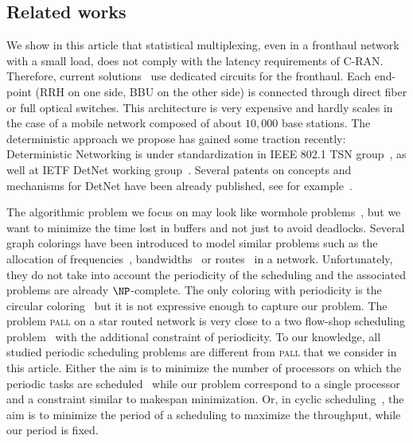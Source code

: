 \documentclass[a4paper,10pt]{article}
\newcommand\pall{\textsc{pall}\xspace}
\begin{document}
 \subsection*{Related works}

  We show in this article that statistical multiplexing, even in a fronthaul network with a small load, does not comply with the latency requirements of C-RAN. Therefore, current solutions~\cite{pizzinat2015things,tayq2017real}  use dedicated circuits for the fronthaul. Each end-point (RRH on one side, BBU on the other side) is connected through direct fiber or full optical switches. This architecture is very expensive and hardly scales in the case of a mobile network composed of about $10,000$ base stations. The deterministic approach we propose has gained some traction recently: Deterministic Networking is under standardization in IEEE 802.1 TSN group~\cite{finn-detnet-architecture-08}, as well at IETF DetNet working group~\cite{ieee802}. Several patents on concepts and mechanisms for DetNet have been already published, see for example~\cite{howe2005time,leclerc2016transmission}. 
     
The algorithmic problem we focus on may look like wormhole problems~\cite{cole1996benefit}, but we want to minimize the time lost in buffers and not just to avoid deadlocks. Several graph colorings have been introduced to model similar problems such as the allocation of frequencies~\cite{borndorfer1998frequency}, bandwidths~\cite{erlebach2001complexity} or routes~\cite{cole1996benefit} in a network. Unfortunately, they do not take into account the periodicity of the scheduling and the associated problems are already $\NP$-complete. The only coloring with periodicity is the circular coloring~\cite{zhou2013multiple} but it is not expressive enough to capture our problem. 
The problem \pall on a star routed network is very close to a two flow-shop scheduling problem~\cite{yu2004minimizing} with the additional constraint of periodicity. To our knowledge, all studied periodic scheduling problems are different from \pall that we consider in this article. 
Either the aim is to minimize the number of processors on which the periodic tasks are scheduled~\cite{korst1991periodic,hanen1993cyclic} while our problem correspond to a single processor and a constraint similar to makespan minimization. Or, in cyclic scheduling~\cite{levner2010complexity}, the aim is to minimize the period of a scheduling to maximize the throughput, while our period is fixed. 
\end{document}
